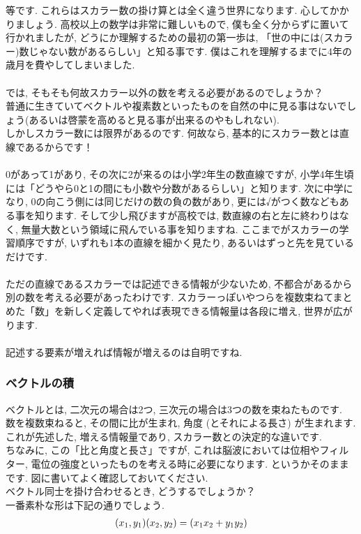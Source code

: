 \documentclass[11pt,a4paper]{jsarticle}
\begin{document}
等です. これらはスカラー数の掛け算とは全く違う世界になります. 心してかかりましょう. 高校以上の数学は非常に難しいもので, 僕も全く分からずに置いて行かれましたが, どうにか理解するための最初の第一歩は, 「世の中には(スカラー)数じゃない数があるらしい」と知る事です. 僕はこれを理解するまでに4年の歳月を費やしてしまいました. \\
\\
では, そもそも何故スカラー以外の数を考える必要があるのでしょうか？\\
普通に生きていてベクトルや複素数といったものを自然の中に見る事はないでしょう(あるいは啓蒙を高めると見る事が出来るのやもしれない).\\
しかしスカラー数には限界があるのです. 何故なら, 基本的にスカラー数とは直線であるからです！ \\
\\
0があって1があり, その次に2が来るのは小学2年生の数直線ですが, 小学4年生頃には「どうやら0と1の間にも小数や分数があるらしい」と知ります. 次に中学になり, 0の向こう側には同じだけの数の負の数があり, 更には√がつく数などもある事を知ります. そして少し飛びますが高校では, 数直線の右と左に終わりはなく, 無量大数という領域に飛んでいる事を知りますね. ここまでがスカラーの学習順序ですが, いずれも1本の直線を細かく見たり, あるいはずっと先を見ているだけです. \\
\\
ただの直線であるスカラーでは記述できる情報が少ないため, 不都合があるから別の数を考える必要があったわけです. スカラーっぽいやつらを複数束ねてまとめた「数」を新しく定義してやれば表現できる情報量は各段に増え, 世界が広がります. \\
\\
記述する要素が増えれば情報が増えるのは自明ですね. 
\\
\subsubsection{ベクトルの積}
ベクトルとは, 二次元の場合は2つ, 三次元の場合は3つの数を束ねたものです. \\
数を複数束ねると, その間に比が生まれ, 角度 (とそれによる長さ) が生まれます. \\
これが先述した, 増える情報量であり, スカラー数との決定的な違いです.\\
ちなみに, この「比と角度と長さ」ですが, これは脳波においては位相やフィルター, 電位の強度といったものを考える時に必要になります. というかそのままです. 図に書いてよく確認しておいてください. 
\\
ベクトル同士を掛け合わせるとき, どうするでしょうか？\\
一番素朴な形は下記の通りでしょう.\\
\begin{eqnarray}
(\mathstrut x_1 , \mathstrut y_1)(\mathstrut x_2 , \mathstrut y_2 ) = (\mathstrut x_1 \mathstrut x_2 + \mathstrut y_1 \mathstrut y_2)
\end{eqnarray}
\end{document}
